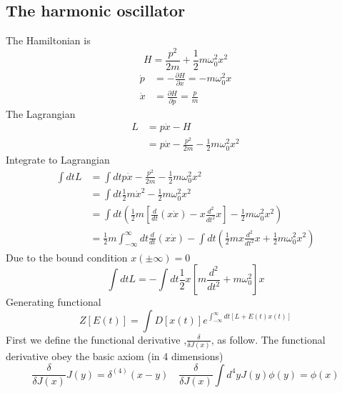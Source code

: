 \documentclass[a4paper,11pt]{article}
\begin{document}
\subsection{The harmonic oscillator}
The Hamiltonian is
\begin{equation*}
  H=\frac{p^2}{2m}+\frac{1}{2}m\omega_0^2x^2
\end{equation*}
\begin{equation*}
  \begin{split}
     \dot{p} &= -\frac{\partial H}{\partial x}=-m\omega_0^2 x \\
     \dot{x} &= \frac{\partial H}{\partial p}=\frac{p}{m}
  \end{split}
\end{equation*}
The Lagrangian
\begin{equation*}
  \begin{split}
     L&=p\dot{x}-H\\
      &=p\dot{x}-\frac{p^2}{2m}-\frac{1}{2}m\omega_0^2 x^2
  \end{split}
\end{equation*}
Integrate to Lagrangian
\begin{equation*}
  \begin{split}
     \int dt L&=\int dt p\dot{x}-\frac{p^2}{2m}-\frac{1}{2}m\omega_0^2x^2\\
       &=\int dt\frac{1}{2}m\dot{x}^2-\frac{1}{2}m\omega_0^2x^2\\
       &=\int dt\left(\frac{1}{2}m\left[\frac{d}{dt}(x\dot{x})-x\frac{d^2}{dt^2}x\right]-\frac{1}{2}m\omega_0^2x^2\right)\\
       &=\frac{1}{2}m\int_{-\infty}^{\infty}dt\frac{d}{dt}(x\dot{x})-\int dt\left(\frac{1}{2}mx\frac{d^2}{dt^2}x+\frac{1}{2}m\omega_0^2x^2\right)
  \end{split}
\end{equation*}
  Due to the bound condition $x(\pm\infty)=0$
\begin{equation*}
  \int dt L=-\int dt\frac{1}{2}x\left[m\frac{d^2}{dt^2}+m\omega_0^2\right]x
\end{equation*}
Generating functional
\begin{equation}\label{generating functional}
  Z[E(t)]=\int D[x(t)]e^{\int_{-\infty}^{\infty}dt[L+E(t)x(t)]}
\end{equation}
First we define the functional derivative ,$\frac{\delta}{\delta J(x)}$, as follow. The functional derivative obey the basic axiom (in 4 dimensions)
\begin{equation*}
  \frac{\delta}{\delta J(x)}J(y)=\delta^(4)(x-y)\quad\frac{\delta}{\delta J(x)}\int d^4y J(y)\phi(y)=\phi(x)
\end{equation*}
\end{document}
